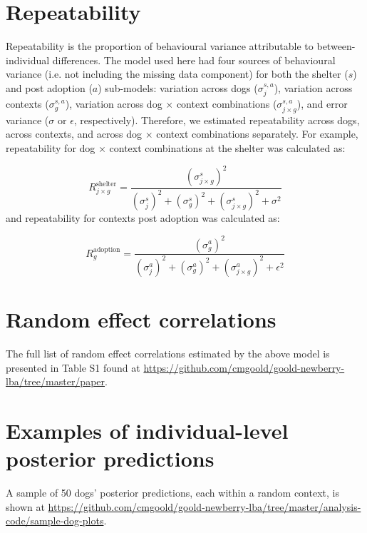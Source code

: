 \documentclass[12pt]{article}
\begin{document}
\newpage
\section{Repeatability}
Repeatability is the proportion of behavioural variance attributable to between-individual differences. The model used here had four sources of behavioural variance (i.e. not including the missing data component) for both the shelter ($s$) and post adoption ($a$) sub-models: variation across dogs ($\sigma_{j}^{s,a}$), variation across contexts ($\sigma_{g}^{s,a}$), variation across dog $\times$ context combinations ($\sigma_{j \times g}^{s,a}$), and error variance ($\sigma$ or $\epsilon$, respectively). Therefore, we estimated repeatability across dogs, across contexts, and across dog $\times$ context combinations separately. For example, repeatability for dog $\times$ context combinations at the shelter was calculated as:

\begin{equation}
  R_{j \times g}^{\text{shelter}} = \frac{(\sigma_{j \times g}^{s})^2}{(\sigma_{j}^{s})^2 + (\sigma_{g}^{s})^2 + (\sigma_{j \times g}^{s})^2 + \sigma^2}
\end{equation}
%
and repeatability for contexts post adoption was calculated as:

\begin{equation}
  R_{g}^{\text{adoption}} = \frac{(\sigma_{g}^{a})^2}{(\sigma_{j}^{a})^2 + (\sigma_{g}^{a})^2 + (\sigma_{j \times g}^{a})^2 + \epsilon^2}
\end{equation}

\newpage
\section{Random effect correlations}
The full list of random effect correlations estimated by the above model is presented in Table S1 found at \href{https://github.com/cmgoold/goold-newberry-lba/tree/master/paper}{https://github.com/cmgoold/goold-newberry-lba/tree/master/paper}.

\section{Examples of individual-level posterior predictions}
A sample of 50 dogs' posterior predictions, each within a random context, is shown at \href{https://github.com/cmgoold/goold-newberry-lba/tree/master/analysis-code/sample-dog-plots}{https://github.com/cmgoold/goold-newberry-lba/tree/master/analysis-code/sample-dog-plots}.
\end{document}
